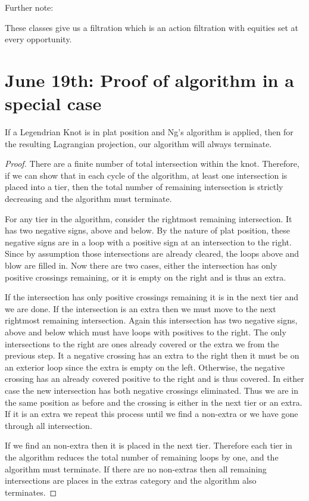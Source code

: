 \documentclass[11pt,oneside]{amsart}
\begin{document}
Further note:

These classes give us a filtration which is an action filtration with equities set at every opportunity. 







\section{June 19th: Proof of algorithm in a special case}


\begin{theorem}
    If a Legendrian Knot is in plat position and Ng's algorithm is applied, then for the resulting Lagrangian projection, our algorithm will always terminate.
\end{theorem}

\begin{proof}
    There are a finite number of total intersection within the knot. Therefore, if we can show that in each cycle of the algorithm, at least one intersection is placed into a tier, then the total number of remaining intersection is strictly decreasing and the algorithm must terminate.

    For any tier in the algorithm, consider the rightmost remaining intersection. It has two negative signs, above and below. By the nature of plat position, these negative signs are in a loop with a positive sign at an intersection to the right. Since by assumption those intersections are already cleared, the loops above and blow are filled in. Now there are two cases, either the intersection has only positive crossings remaining, or it is empty on the right and is thus an extra.

    If the intersection has only positive crossings remaining it is in the next tier and we are done. If the intersection is an extra then we must move to the next rightmost remaining intersection. Again this intersection has two negative signs, above and below which must have loops with positives to the right. The only intersections to the right are ones already covered or the extra we from the previous step. It a negative crossing has an extra to the right then it must be on an exterior loop since the extra is empty on the left. Otherwise, the negative crossing has an already covered positive to the right and is thus covered. In either case the new intersection has both negative crossings eliminated. Thus we are in the same position as before and the crossing is either in the next tier or an extra. If it is an extra we repeat this process until we find a non-extra or we have gone through all intersection.

    If we find an non-extra then it is placed in the next tier. Therefore each tier in the algorithm reduces the total number of remaining loops by one, and the algorithm must terminate. If there are no non-extras then all remaining intersections are places in the extras category and the algorithm also terminates. 
\end{proof}
\end{document}
